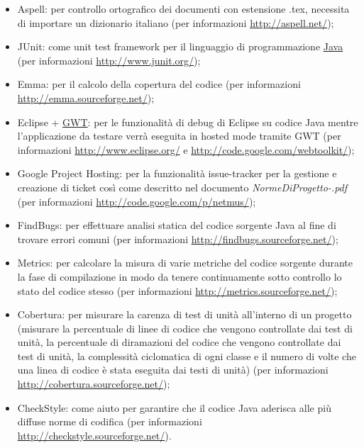 \begin{itemize}

\item Aspell: per controllo ortografico dei
documenti con estensione .tex, necessita di importare un dizionario italiano
(per informazioni \url{http://aspell.net/});

\item JUnit: come unit test framework per il linguaggio di
programmazione \underline{Java} (per informazioni
\url{http://www.junit.org/});

\item Emma: per il calcolo della copertura del codice (per informazioni
\url{http://emma.sourceforge.net/});

\item Eclipse + \underline{GWT}: per le funzionalit\`a di debug di Eclipse su
codice Java mentre l'applicazione da testare verr\`a eseguita in hosted mode
tramite GWT (per informazioni \url{http://www.eclipse.org/} e
\url{http://code.google.com/webtoolkit/});

\item Google Project Hosting: per la funzionalit\`a issue-tracker
per la gestione e creazione di ticket cos\`i come descritto nel documento
\emph{NormeDiProgetto-\versionenormeprogetto.pdf} (per informazioni
\url{http://code.google.com/p/netmus/});

\item FindBugs: per effettuare analisi statica del codice
sorgente Java al fine di trovare errori comuni (per informazioni
\url{http://findbugs.sourceforge.net/});

\item Metrics: per calcolare la misura di varie metriche del
codice sorgente durante la fase di compilazione in modo da tenere continuamente
sotto controllo lo stato del codice stesso (per informazioni
\url{http://metrics.sourceforge.net/});

\item Cobertura: per misurare la carenza di test di unit\`a
all'interno di un progetto (misurare la percentuale di linee di codice che
vengono controllate dai test di unit\`a, la percentuale di diramazioni del
codice che vengono controllate dai test di unit\`a, la complessit\`a ciclomatica
di ogni classe e il numero di volte che una linea di codice \`e stata eseguita
dai testi di unit\`a) (per informazioni \url{http://cobertura.sourceforge.net/});

\item CheckStyle: come aiuto per garantire che il codice Java
aderisca alle pi\`u diffuse norme di codifica (per informazioni
\url{http://checkstyle.sourceforge.net/}).
\end{itemize}


